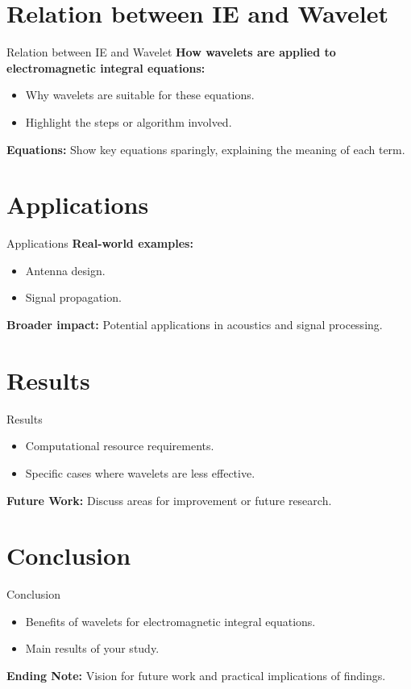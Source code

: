 \documentclass{beamer}
\begin{document}
\section{Relation between IE and Wavelet}
\begin{frame}{Relation between IE and Wavelet}
    \textbf{How wavelets are applied to electromagnetic integral equations:}
    \begin{itemize}
        \item Why wavelets are suitable for these equations.
        \item Highlight the steps or algorithm involved.
    \end{itemize}
    \textbf{Equations:} Show key equations sparingly, explaining the meaning of each term.
\end{frame}

\section{Applications}
\begin{frame}{Applications}
    \textbf{Real-world examples:}
    \begin{itemize}
        \item Antenna design.
        \item Signal propagation.
    \end{itemize}
    \textbf{Broader impact:} Potential applications in acoustics and signal processing.
\end{frame}

\section{Results}
\begin{frame}{Results}
    \begin{itemize}
        \item Computational resource requirements.
        \item Specific cases where wavelets are less effective.
    \end{itemize}
    \textbf{Future Work:} Discuss areas for improvement or future research.
\end{frame}

\section{Conclusion}
\begin{frame}{Conclusion}
    \begin{itemize}
        \item Benefits of wavelets for electromagnetic integral equations.
        \item Main results of your study.
    \end{itemize}
    \textbf{Ending Note:} Vision for future work and practical implications of findings.
\end{frame}
\end{document}
